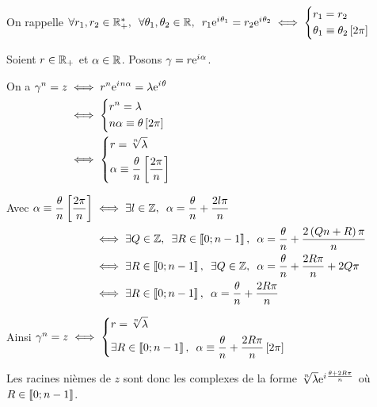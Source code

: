 \begin{dem}
On rappelle \(\quantifs{\forall r_1,r_2\in\Rps;\forall\theta_1,\theta_2\in\R}r_1\e{\i\theta_1}=r_2\e{\i\theta_2}\ssi\begin{dcases}r_1=r_2 \\ \theta_1\equiv\theta_2\croch{2\pi}\end{dcases}\)

Soient \(r\in\mathbb{R}_+\) et \(\alpha\in\mathbb{R}\). Posons \(\gamma=r\mathrm{e}^{i\mkern1mu\alpha}\).

On a \(\begin{aligned}[t]
\gamma^n=z&\iff r^n\mathrm{e}^{i\mkern1mu n\alpha}=\lambda\mathrm{e}^{i\mkern1mu\theta} \\
&\iff\begin{dcases}r^n=\lambda \\ n\alpha\equiv\theta\left[2\pi\right]\end{dcases} \\
&\iff\begin{dcases}r=\sqrt[n]{\lambda} \\ \alpha\equiv\dfrac{\theta}{n}\left[\dfrac{2\pi}{n}\right]\end{dcases}
\end{aligned}\)

Avec \(\begin{aligned}[t]
\alpha\equiv\dfrac{\theta}{n}\croch{\dfrac{2\pi}{n}}&\ssi\quantifs{\exists l\in\Z}\alpha=\dfrac{\theta}{n}+\dfrac{2l\pi}{n} \\
&\ssi\quantifs{\exists Q\in\Z;\exists R\in\interventierii{0}{n-1}}\alpha=\dfrac{\theta}{n}+\dfrac{2\paren{Qn+R}\pi}{n} \\
&\ssi\quantifs{\exists R\in\interventierii{0}{n-1};\exists Q\in\Z}\alpha=\dfrac{\theta}{n}+\dfrac{2R\pi}{n}+2Q\pi \\
&\ssi\quantifs{\exists R\in\interventierii{0}{n-1}}\alpha=\dfrac{\theta}{n}+\dfrac{2R\pi}{n}
\end{aligned}\)

Ainsi \(\gamma^n=z\ssi\begin{dcases}r=\sqrt[n]{\lambda} \\ \quantifs{\exists R\in\interventierii{0}{n-1}}\alpha\equiv\dfrac{\theta}{n}+\dfrac{2R\pi}{n}\croch{2\pi}\end{dcases}\)

Les racines nièmes de \(z\) sont donc les complexes de la forme \(\sqrt[n]{\lambda}\mathrm{e}^{i\mkern1mu\frac{\theta+2R\pi}{n}}\) où \(R\in\left\llbracket0;n-1\right\rrbracket\).
\end{dem}

